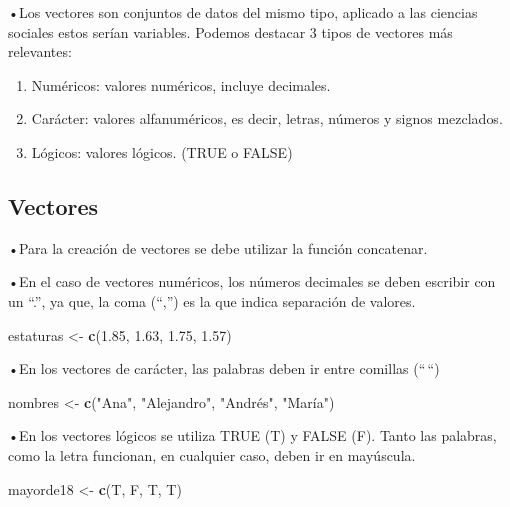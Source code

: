 \documentclass[
]{article}
\newenvironment{Shaded}{\begin{snugshade}}{\end{snugshade}}
\newcommand{\FloatTok}[1]{\textcolor[rgb]{0.00,0.00,0.81}{#1}}
\newcommand{\FunctionTok}[1]{\textcolor[rgb]{0.13,0.29,0.53}{\textbf{#1}}}
\newcommand{\NormalTok}[1]{#1}
\newcommand{\OtherTok}[1]{\textcolor[rgb]{0.56,0.35,0.01}{#1}}
\newcommand{\StringTok}[1]{\textcolor[rgb]{0.31,0.60,0.02}{#1}}
\begin{document}
•Los vectores son conjuntos de datos del mismo tipo, aplicado a las
ciencias sociales estos serían variables. Podemos destacar 3 tipos de
vectores más relevantes:

\begin{enumerate}
\def\labelenumi{\arabic{enumi}.}
\item
  Numéricos: valores numéricos, incluye decimales.
\item
  Carácter: valores alfanuméricos, es decir, letras, números y signos
  mezclados.
\item
  Lógicos: valores lógicos. (TRUE o FALSE)
\end{enumerate}

\subsection{Vectores}\label{vectores-1}

•Para la creación de vectores se debe utilizar la función concatenar.

•En el caso de vectores numéricos, los números decimales se deben
escribir con un ``.'', ya que, la coma (``,'') es la que indica
separación de valores.

\begin{Shaded}
\begin{Highlighting}[]
\NormalTok{estaturas }\OtherTok{\textless{}{-}} \FunctionTok{c}\NormalTok{(}\FloatTok{1.85}\NormalTok{, }\FloatTok{1.63}\NormalTok{, }\FloatTok{1.75}\NormalTok{, }\FloatTok{1.57}\NormalTok{)}
\end{Highlighting}
\end{Shaded}

•En los vectores de carácter, las palabras deben ir entre comillas
(``\,``)

\begin{Shaded}
\begin{Highlighting}[]
\NormalTok{nombres }\OtherTok{\textless{}{-}} \FunctionTok{c}\NormalTok{(}\StringTok{"Ana"}\NormalTok{, }\StringTok{"Alejandro"}\NormalTok{, }\StringTok{"Andrés"}\NormalTok{, }\StringTok{"María"}\NormalTok{)}
\end{Highlighting}
\end{Shaded}

•En los vectores lógicos se utiliza TRUE (T) y FALSE (F). Tanto las
palabras, como la letra funcionan, en cualquier caso, deben ir en
mayúscula.

\begin{Shaded}
\begin{Highlighting}[]
\NormalTok{mayorde18 }\OtherTok{\textless{}{-}} \FunctionTok{c}\NormalTok{(T, F, T, T)}
\end{Highlighting}
\end{Shaded}
\end{document}
